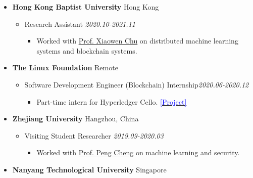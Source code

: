\documentclass[11pt]{article}
\begin{document}
\begin{itemize}[leftmargin=0em, noitemsep, nolistsep]
\begin{itemize}[noitemsep, nolistsep, leftmargin=0em]
\begin{itemize}
                \small
                \item[--] Maintainer of Hyperledger Fabric Python SDK.
             \end{itemize}
        \end{itemize}
    \item[] \large\textbf{Hong Kong Baptist University} \hfill Hong Kong
        \begin{itemize}[noitemsep, nolistsep, leftmargin=0em]
            \item[] {Research Assistant} \hfill \textit{2020.10-2021.11}
             \begin{itemize}
                \small
                \item[--] Worked with \href{https://www.comp.hkbu.edu.hk/~chxw/}{Prof. Xiaowen Chu} on distributed machine learning systems and blockchain systems.
             \end{itemize}
        \end{itemize}
    \item[] \large\textbf{The Linux Foundation} \hfill Remote
        \begin{itemize}[noitemsep, nolistsep, leftmargin=0em]
            \item[] Software Development Engineer (Blockchain) Internship\hfill \textit{2020.06-2020.12}
            \begin{itemize}
                \small
                \item[--] Part-time intern for Hyperledger Cello. \href{https://github.com/hyperledger-cello/cello}{\textcolor{blue}{[Project]}}
            \end{itemize}
        \end{itemize}
    \item[] \large\textbf{Zhejiang University} \hfill Hangzhou, China
        \begin{itemize}[noitemsep, nolistsep, leftmargin=0em]
            \item[] {Visiting Student Researcher} \hfill \textit{2019.09-2020.03}
             \begin{itemize}
                \small
                \item[--] Worked with \href{https://person.zju.edu.cn/en/cp}{Prof. Peng Cheng} on machine learning and security.
             \end{itemize}
        \end{itemize}
    \item[] \large\textbf{Nanyang Technological University} \hfill Singapore

\end{itemize}
\end{document}
